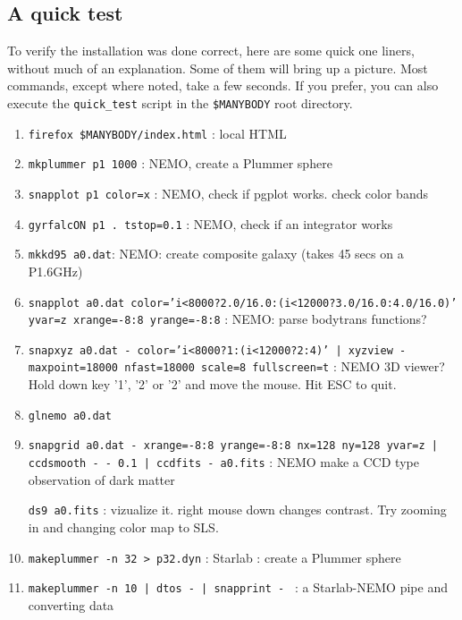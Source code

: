 \begin{itemize}
\begin{itemize}
\section{A quick test}

To verify the installation was done correct, here are some quick
one liners, without much of an explanation. Some of them will bring up
a picture. Most commands, except where noted, take a few seconds. If
you prefer, you can also execute the {\tt quick\_test} script in
the {\tt \$MANYBODY} root directory.
\begin{enumerate}

\item
{\tt firefox \$MANYBODY/index.html} : local HTML 

\item
{\tt mkplummer p1 1000} : NEMO, create a Plummer sphere

\item
{\tt snapplot p1 color=x} : NEMO, check if pgplot works. check color bands 

\item
{\tt gyrfalcON p1 . tstop=0.1} : NEMO, check if an integrator works

\item
{\tt mkkd95 a0.dat}: NEMO: create composite galaxy (takes 45 secs on a P1.6GHz)

\item
{\tt snapplot a0.dat color='i<8000?2.0/16.0:(i<12000?3.0/16.0:4.0/16.0)' yvar=z xrange=-8:8 yrange=-8:8} :
NEMO: parse bodytrans functions?

\item
{\tt snapxyz a0.dat - color='i<8000?1:(i<12000?2:4)' | xyzview - maxpoint=18000 nfast=18000 scale=8 fullscreen=t} : 
NEMO 3D viewer? Hold down key '1', '2' or '2' and move the mouse. Hit ESC to quit.

\item 
{\tt glnemo a0.dat}

\item 
{\tt snapgrid a0.dat - xrange=-8:8 yrange=-8:8 nx=128 ny=128 yvar=z | ccdsmooth - - 0.1 | ccdfits - a0.fits} :
NEMO make a CCD type observation of dark matter

{\tt ds9 a0.fits} : vizualize it. right mouse down changes contrast. Try zooming in and changing color map to SLS.

\item
{\tt makeplummer -n 32 > p32.dyn} : Starlab : create a Plummer sphere


\item
{\tt makeplummer -n 10 | dtos - | snapprint - } : a Starlab-NEMO pipe and converting data


\end{enumerate}
\end{itemize}
\end{itemize}
